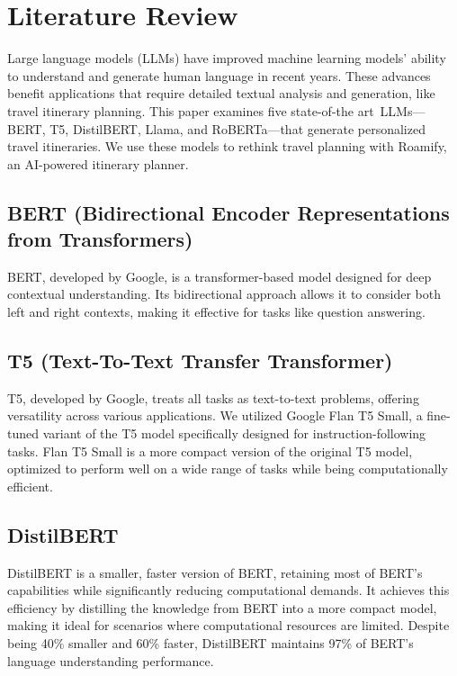 \documentclass[conference]{IEEEtran}
\begin{document}
\section{Literature Review}

    Large language models (LLMs) have improved machine learning models' ability to understand and generate human language in recent years. These advances benefit applications that require detailed textual analysis and generation, like travel itinerary planning. This paper examines five state-of-the art LLMs—BERT, T5, DistilBERT, Llama, and RoBERTa—that generate personalized travel itineraries. We use these models to rethink travel planning with Roamify, an AI-powered itinerary planner.

    \subsection{BERT (Bidirectional Encoder Representations from Transformers)}
        BERT, developed by Google, is a transformer-based model designed for deep contextual understanding. Its bidirectional approach allows it to consider both left and right contexts, making it effective for tasks like question answering.

    \subsection{T5 (Text-To-Text Transfer Transformer)}
        T5, developed by Google, treats all tasks as text-to-text problems, offering versatility across various applications. We utilized Google Flan T5 Small, a fine-tuned variant of the T5 model specifically designed for instruction-following tasks. Flan T5 Small is a more compact version of the original T5 model, optimized to perform well on a wide range of tasks while being computationally efficient.

    \subsection{DistilBERT}
        DistilBERT is a smaller, faster version of BERT, retaining most of BERT's capabilities while significantly reducing computational demands. It achieves this efficiency by distilling the knowledge from BERT into a more compact model, making it ideal for scenarios where computational resources are limited. Despite being 40\% smaller and 60\% faster, DistilBERT maintains 97\% of BERT's language understanding performance.
\end{document}
